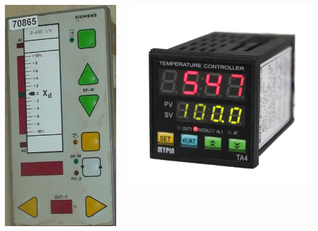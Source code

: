 \begin{frame}
\begin{columns}
\begin{column}{0.5\linewidth}
\begin{columns}
\begin{column}{0.4\linewidth}
					\includegraphics[height=0.7\textheight]{img/278}

				\end{column}
				\begin{column}{0.6\linewidth}
					\includegraphics[height=0.4\textheight]{img/41LH64+SGWL}

				\end{column}
			\end{columns}
		\end{column}
	\end{columns}
\end{frame}
